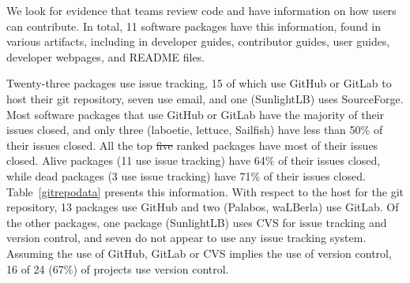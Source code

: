 \documentclass[final, 3p, times, authoryear]{elsarticle}
\providecommand{\DIFaddtex}[1]{{\protect\color{blue}\uwave{#1}}} %
\providecommand{\DIFdeltex}[1]{{\protect\color{red}\sout{#1}}}                      %
\providecommand{\DIFaddbegin}{} %
\providecommand{\DIFaddend}{} %
\providecommand{\DIFdelbegin}{} %
\providecommand{\DIFdelend}{} %
\providecommand{\DIFadd}[1]{\texorpdfstring{\DIFaddtex{#1}}{#1}} %
\providecommand{\DIFdel}[1]{\texorpdfstring{\DIFdeltex{#1}}{}} %
\begin{document}
We look for evidence that teams review code and have information on how users
can contribute. In total, 11 software packages have this information, found in
various artifacts, including in developer guides, contributor guides, user
guides, developer webpages, and README files. 

Twenty-three packages use issue tracking, 15 of which use GitHub or GitLab to
host their git repository, seven use email, and one (SunlightLB) uses
SourceForge. Most software packages that use GitHub or GitLab have the majority
of their issues closed, and only three (laboetie, lettuce, Sailfish) have less
than 50\% of their issues closed. All the top \DIFdelbegin \DIFdel{five }\DIFdelend \DIFaddbegin \DIFadd{four }\DIFaddend ranked packages have most of
their issues closed. Alive packages (11 use issue tracking) have 64\% of their
issues closed, while dead packages (3 use issue tracking) have 71\% of their
issues closed. Table~\ref{gitrepodata} presents this information. With respect
to the host for the git repository, 13 packages use GitHub and two (Palabos,
waLBerla) use GitLab. Of the other packages, one package (SunlightLB) uses CVS
for issue tracking and version control, and seven do not appear to use any issue
tracking system.  Assuming the use of GitHub, GitLab or CVS implies the use of
version control, 16 of 24 (67\%) of projects use version control.
\end{document}
